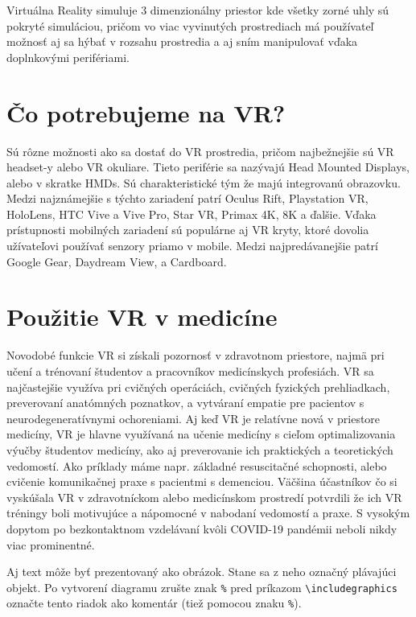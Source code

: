 \documentclass[10pt,twoside,slovak,a4paper]{article}
\begin{document}
Virtuálna Reality simuluje 3 dimenzionálny priestor kde všetky zorné uhly sú pokryté simuláciou, pričom vo viac vyvinutých prostrediach má používateľ možnosť aj sa hýbať v rozsahu prostredia a aj sním manipulovať vďaka doplnkovými perifériami.

\section{Čo potrebujeme na VR?} \label{Devices}

Sú rôzne možnosti ako sa dostať do VR prostredia, pričom najbežnejšie sú VR headset-y alebo VR okuliare.
Tieto periférie sa nazývajú Head Mounted Displays, alebo v skratke HMDs. Sú charakteristické tým že majú integrovanú obrazovku. Medzi najznámejšie s týchto zariadení patrí Oculus Rift, Playstation VR, HoloLens, HTC Vive a Vive Pro, Star VR, Primax 4K, 8K a ďalšie.
Vďaka prístupnosti mobilných zariadení sú populárne aj VR kryty, ktoré dovolia užívateľovi používať senzory priamo v mobile. Medzi najpredávanejšie patrí Google Gear, Daydream View, a Cardboard.

\section{Použitie VR v medicíne} \label{Usecase}

Novodobé funkcie VR si získali pozornosť v zdravotnom priestore, najmä pri učení a trénovaní študentov a pracovníkov medicínskych profesiách. VR sa najčastejšie využíva pri cvičných operáciách, cvičných fyzických prehliadkach, preverovaní anatómných poznatkov, a vytváraní empatie pre pacientov s neurodegeneratívnymi ochoreniami. Aj keď VR je relatívne nová v priestore medicíny, VR je hlavne využívaná na učenie medicíny s cieľom optimalizovania výučby študentov medicíny, ako aj preverovanie ich praktických a teoretických vedomostí. Ako príklady máme napr. základné resuscitačné schopnosti, alebo cvičenie komunikačnej praxe s pacientmi s demenciou. Väčšina účastníkov čo si vyskúšala VR v zdravotníckom alebo medicínskom prostredí potvrdili že ich VR tréningy boli motivujúce a nápomocné v nabodaní vedomostí a praxe. S vysokým dopytom po bezkontaktnom vzdelávaní kvôli COVID-19 pandémii neboli nikdy viac prominentné.

\begin{figure*}[tbh]
\centering
Aj text môže byť prezentovaný ako obrázok. Stane sa z neho označný plávajúci objekt. Po vytvorení diagramu zrušte znak \texttt{\%} pred príkazom \verb|\includegraphics| označte tento riadok ako komentár (tiež pomocou znaku \texttt{\%}).
\label{f:rozhod}
\end{figure*}
\end{document}
